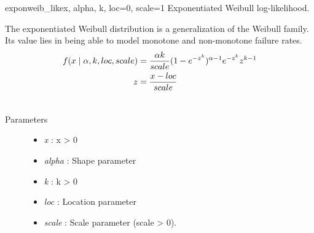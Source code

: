 \hypertarget{pymc.distributions.exponweib_like}{}\begin{funcdesc}{exponweib\_like}{x, alpha, k, loc=0, scale=1}
Exponentiated Weibull log-likelihood.

The exponentiated Weibull distribution is a generalization of the Weibull
family. Its value lies in being able to model monotone and non-monotone
failure rates.
\begin{gather}
\begin{split}f(x \mid \alpha,k,loc,scale)  & = \frac{\alpha k}{scale} (1-e^{-z^k})^{\alpha-1} e^{-z^k} z^{k-1} \\
z & = \frac{x-loc}{scale}\end{split}\notag\\\begin{split}\end{split}\notag
\end{gather}\begin{description}
\item[Parameters] \leavevmode\begin{itemize}
\item {}
\emph{x} : x \textgreater{} 0

\item {}
\emph{alpha} : Shape parameter

\item {}
\emph{k} : k \textgreater{} 0

\item {}
\emph{loc} : Location parameter

\item {}
\emph{scale} : Scale parameter (scale \textgreater{} 0).

\end{itemize}

\end{description}
\end{funcdesc}

